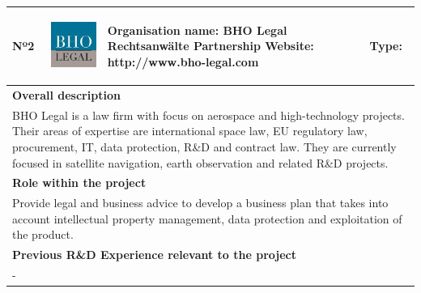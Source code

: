 \begin{longtable}[H]{|p{0.7cm}|p{4cm}|p{7cm}|p{1.3cm}|}
	\hline
	\begin{center} Nº2 \end{center} & \begin{center} \includegraphics[scale=0.4]{./logos/BHO-logo} \end{center} & \begin{center} \textbf{Organisation name:} BHO Legal Rechtsanwälte Partnership \newline \textbf{Website:} http://www.bho-legal.com \end{center} & \begin{center} Type: \end{center} \\ \hline
	
	\multicolumn{4}{|p{13cm}|}{\textbf{Overall description}}  \\ \hline
	
	\multicolumn{4}{|p{14.5cm}|}{BHO Legal is a law firm with focus on aerospace and high-technology projects. Their areas of expertise are international space law, EU regulatory law, procurement, IT, data protection, R\&D and contract law. They are currently focused in satellite navigation, earth observation and related R\&D projects.}  \\ \hline
	
	\multicolumn{4}{|p{13cm}|}{\textbf{Role within the project}}   \\ \hline
	
	\multicolumn{4}{|p{14.5cm}|}{Provide legal and business advice to develop a business plan that takes into account intellectual property management, data protection and exploitation of the product.}  \\ \hline
	
	\multicolumn{4}{|p{13cm}|}{\textbf{Previous R\&D Experience relevant to the project}}  \\ \hline
	
	\multicolumn{4}{|p{14.5cm}|}{-}  \\ \hline
	

\end{longtable}
